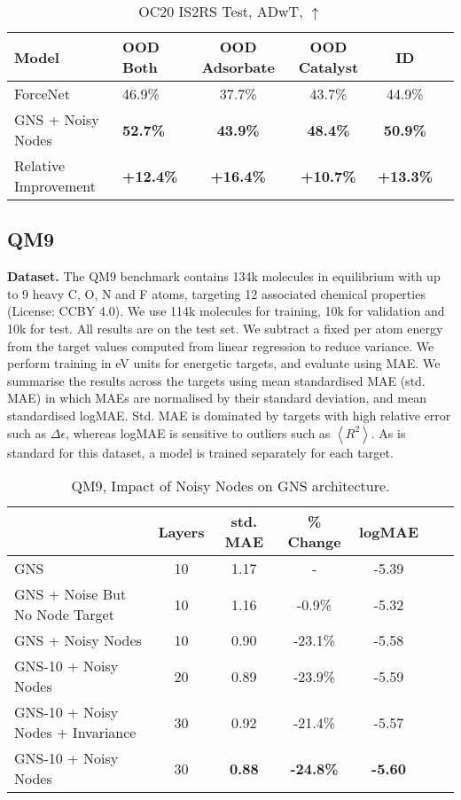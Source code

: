 \documentclass{article} \usepackage{iclr2022_conference,times}
\begin{document}
\begin{table}
\caption{OC20 IS2RS Test, ADwT, $\uparrow$}
\label{tab:positions_test}
\centering
\begin{tabular}{llcccc}
  \toprule
  Model & OOD Both & OOD Adsorbate & OOD Catalyst & ID \\
  \midrule
  ForceNet & 46.9\% & 37.7\% & 43.7\% & 44.9\% \\
  
  GNS + Noisy Nodes & \textbf{52.7\%} & \textbf{43.9\%} & \textbf{48.4\%} & \textbf{50.9\%} \\
  \midrule
  Relative Improvement & \textbf{+12.4\%} & \textbf{+16.4\%} & \textbf{+10.7\%} & \textbf{+13.3\%} \\
  \bottomrule
\end{tabular}
\end{table}

\subsection{QM9}\label{eval-qm9}
\textbf{Dataset.} The QM9 benchmark \citep{Ramakrishnan2014QuantumCS} contains 134k molecules in equilibrium with up to 9 heavy C, O, N and F atoms, targeting 12 associated chemical properties (License: CCBY 4.0). We use 114k molecules for training, 10k for validation and 10k for test. All results are on the test set. We subtract a fixed per atom energy from the target values computed from linear regression to reduce variance.  We perform training in eV units for energetic targets, and evaluate using MAE. We summarise the results across the targets using mean standardised MAE (std. MAE) in which MAEs are normalised by their standard deviation, and mean standardised logMAE. Std. MAE is dominated by targets with high relative error such as $\Delta\epsilon$, whereas logMAE is sensitive to outliers such as $\left< R^2 \right>$. As is standard for this dataset, a model is trained separately for each target.

\begin{table}
\caption{QM9, Impact of Noisy Nodes on GNS architecture.}
\centering
\begin{tabular}{lcccccc}
\toprule
    & Layers & std. MAE & \% Change & logMAE & \\
\midrule
GNS & 10  & 1.17 & - & -5.39 \\
GNS + Noise But No Node Target & 10 & 1.16 & -0.9\% & -5.32\\
GNS + Noisy Nodes & 10 & 0.90 & -23.1\% & -5.58\\
GNS-10 + Noisy Nodes & 20 & 0.89 & -23.9\% & -5.59\\
GNS-10 + Noisy Nodes + Invariance & 30 & 0.92 & -21.4\% & -5.57 \\
GNS-10 + Noisy Nodes & 30 & \textbf{0.88} & \textbf{-24.8\%} & \textbf{-5.60}\\
\bottomrule
\end{tabular}
\label{tab:qm9_comparison}
\end{table}
\end{document}
